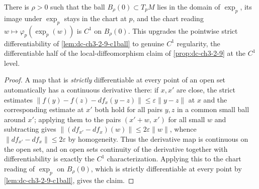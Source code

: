\begin{lemma}
  \label{lem:dc-ch3-2-9-c1}


  There is $\rho > 0$ such that the ball $B_\rho(0) \subset T_pM$ lies in the
  domain of $\exp_p$, its image under $\exp_p$ stays in the chart at $p$, and
  the chart reading $w \mapsto \varphi_p(\exp_p(w))$ is $C^1$ on $B_\rho(0)$.
  This upgrades the pointwise strict differentiability of
  \cref{lem:dc-ch3-2-9-c1ball} to genuine $C^1$ regularity, the differentiable
  half of the local-diffeomorphism claim of \cref{prop:dc-ch3-2-9} at the
  $C^1$ level.
\end{lemma}
\begin{proof}
  \sketch

  A map that is \emph{strictly} differentiable at every point of an open set
  automatically has a continuous derivative there: if $x, x'$ are close, the
  strict estimates
  $\|f(y) - f(z) - df_x(y - z)\| \le \varepsilon \|y - z\|$ at $x$ and the
  corresponding estimate at $x'$ both hold for all pairs $y, z$ in a common
  small ball around $x'$; applying them to the pairs $(x' + w,\, x')$ for all
  small $w$ and subtracting gives
  $\|(df_{x'} - df_x)(w)\| \le 2\varepsilon \|w\|$, whence
  $\|df_{x'} - df_x\| \le 2\varepsilon$ by homogeneity. Thus the derivative
  map is continuous on the open set, and on open sets continuity of the
  derivative together with differentiability is exactly the $C^1$
  characterization. Applying this to the chart reading of $\exp_p$ on
  $B_\rho(0)$, which is strictly differentiable at every point by
  \cref{lem:dc-ch3-2-9-c1ball}, gives the claim.
\end{proof}

